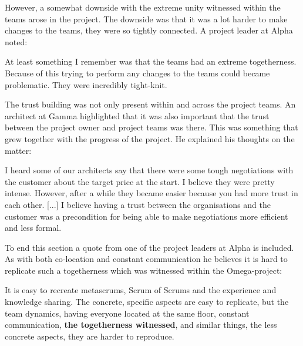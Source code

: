 However, a somewhat downside with the extreme unity witnessed within the teams arose in the project. The downside was that it was a lot harder to make changes to the teams, they were so tightly connected. A project leader at Alpha noted:

\begin{fancyquotes}
At least something I remember was that the teams had an extreme togetherness. Because of this trying to perform any changes to the teams could became problematic. They were incredibly tight-knit.
\end{fancyquotes}

The trust building was not only present within and across the project teams. An architect at Gamma highlighted that it was also important that the trust between the project owner and project teams was there. This was something that grew together with the progress of the project. He explained his thoughts on the matter:

\begin{fancyquotes}
I heard some of our architects say that there were some tough negotiations with the customer about the target price at the start. I believe they were pretty intense. However, after a while they became easier because you had more trust in each other. [...] I believe having a trust between the organisations and the customer was a precondition for being able to make negotiations more efficient and less formal.
\end{fancyquotes}

To end this section a quote from one of the project leaders at Alpha is included. As with both co-location and constant communication he believes it is hard to replicate such a togetherness which was witnessed within the Omega-project:

\begin{fancyquotes}
It is easy to recreate metascrums, Scrum of Scrums and the experience and knowledge sharing. The concrete, specific aspects are easy to replicate, but the team dynamics, having everyone located at the same floor, constant communication, \textbf{the togetherness witnessed}, and similar things, the less concrete aspects, they are harder to reproduce.
\end{fancyquotes}